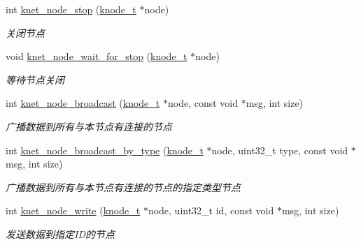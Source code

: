 \begin{DoxyCompactItemize}
int \hyperlink{a00135_ga8d63fa0942bef4d3db588bb72c57df91_ga8d63fa0942bef4d3db588bb72c57df91}{knet\+\_\+node\+\_\+stop} (\hyperlink{a00066_a5e720b27efbc9ad744240f5f4233763a_a5e720b27efbc9ad744240f5f4233763a}{knode\+\_\+t} $\ast$node)
\begin{DoxyCompactList}\small\item\em 关闭节点 \end{DoxyCompactList}\item 
void \hyperlink{a00135_ga0df83a5efbf28d8e8d08a46d084265d3_ga0df83a5efbf28d8e8d08a46d084265d3}{knet\+\_\+node\+\_\+wait\+\_\+for\+\_\+stop} (\hyperlink{a00066_a5e720b27efbc9ad744240f5f4233763a_a5e720b27efbc9ad744240f5f4233763a}{knode\+\_\+t} $\ast$node)
\begin{DoxyCompactList}\small\item\em 等待节点关闭 \end{DoxyCompactList}\item 
int \hyperlink{a00135_ga7960dad8d814bd4f07697e4484c57885_ga7960dad8d814bd4f07697e4484c57885}{knet\+\_\+node\+\_\+broadcast} (\hyperlink{a00066_a5e720b27efbc9ad744240f5f4233763a_a5e720b27efbc9ad744240f5f4233763a}{knode\+\_\+t} $\ast$node, const void $\ast$msg, int size)
\begin{DoxyCompactList}\small\item\em 广播数据到所有与本节点有连接的节点 \end{DoxyCompactList}\item 
int \hyperlink{a00135_gabf69af301870cd224020921ec5c310d9_gabf69af301870cd224020921ec5c310d9}{knet\+\_\+node\+\_\+broadcast\+\_\+by\+\_\+type} (\hyperlink{a00066_a5e720b27efbc9ad744240f5f4233763a_a5e720b27efbc9ad744240f5f4233763a}{knode\+\_\+t} $\ast$node, uint32\+\_\+t type, const void $\ast$msg, int size)
\begin{DoxyCompactList}\small\item\em 广播数据到所有与本节点有连接的节点的指定类型节点 \end{DoxyCompactList}\item 
int \hyperlink{a00135_ga5d8bef9ccbb5cc7807beeddb558345a9_ga5d8bef9ccbb5cc7807beeddb558345a9}{knet\+\_\+node\+\_\+write} (\hyperlink{a00066_a5e720b27efbc9ad744240f5f4233763a_a5e720b27efbc9ad744240f5f4233763a}{knode\+\_\+t} $\ast$node, uint32\+\_\+t id, const void $\ast$msg, int size)
\begin{DoxyCompactList}\small\item\em 发送数据到指定\+I\+D的节点 \end{DoxyCompactList}\item 

\end{DoxyCompactItemize}
